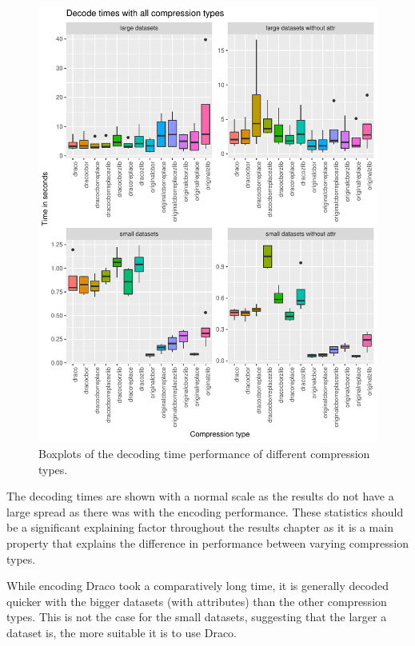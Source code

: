 \begin{figure}[h!]
    \includegraphics[scale=0.88]{figs/benchmark/overview/decodingtimes.pdf}
    \caption{Boxplots of the decoding time performance of different compression types.}
    \label{fig:decodingtimes}
\end{figure}


The decoding times are shown with a normal scale as the results do not have a large spread as there was with the encoding performance.
These statistics should be a significant explaining factor throughout the results chapter as it is a main property that explains the difference in performance between varying compression types.

While encoding Draco took a comparatively long time, it is generally decoded quicker with the bigger datasets (with attributes) than the other compression types.
This is not the case for the small datasets, suggesting that the larger a dataset is, the more suitable it is to use Draco.

